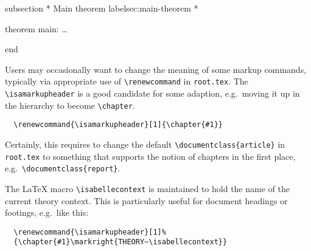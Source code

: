 \begin{isabellebody}
\begin{isamarkuptext}
\begin{ttbox}
  subsection {\ttlbrace}* Main theorem {\ttback}label{\ttlbrace}sec:main-theorem{\ttrbrace} *{\ttrbrace}

  theorem main: \dots

  end
  \end{ttbox}

  Users may occasionally want to change the meaning of some markup
  commands, typically via appropriate use of \verb,\renewcommand, in
  \texttt{root.tex}.  The \verb,\isamarkupheader, is a good candidate
  for some adaption, e.g.\ moving it up in the hierarchy to become
  \verb,\chapter,.

\begin{verbatim}
  \renewcommand{\isamarkupheader}[1]{\chapter{#1}}
\end{verbatim}

  Certainly, this requires to change the default
  \verb,\documentclass{article}, in \texttt{root.tex} to something
  that supports the notion of chapters in the first place, e.g.\
  \verb,\documentclass{report},.

  \medskip The {\LaTeX} macro \verb,\isabellecontext, is maintained to
  hold the name of the current theory context.  This is particularly
  useful for document headings or footings, e.g.\ like this:

\begin{verbatim}
  \renewcommand{\isamarkupheader}[1]%
  {\chapter{#1}\markright{THEORY~\isabellecontext}}
\end{verbatim}


\end{isamarkuptext}
\end{isabellebody}

